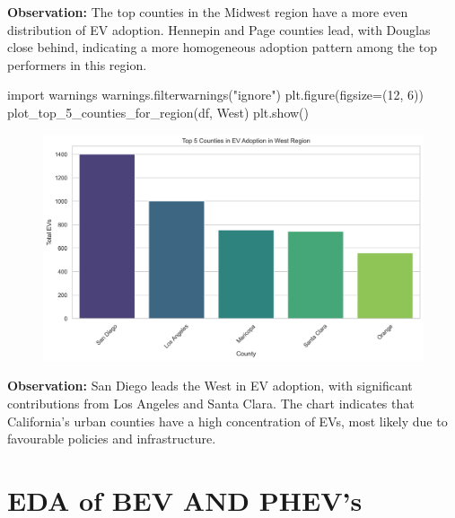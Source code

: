 \documentclass[
  letterpaper,
  DIV=11,
  numbers=noendperiod]{scrartcl}
\newenvironment{Shaded}{\begin{snugshade}}{\end{snugshade}}
\newcommand{\DecValTok}[1]{\textcolor[rgb]{0.68,0.00,0.00}{#1}}
\newcommand{\ImportTok}[1]{\textcolor[rgb]{0.00,0.46,0.62}{#1}}
\newcommand{\NormalTok}[1]{\textcolor[rgb]{0.00,0.23,0.31}{#1}}
\newcommand{\OperatorTok}[1]{\textcolor[rgb]{0.37,0.37,0.37}{#1}}
\newcommand{\StringTok}[1]{\textcolor[rgb]{0.13,0.47,0.30}{#1}}
\begin{document}
\textbf{Observation:} The top counties in the Midwest region have a more
even distribution of EV adoption. Hennepin and Page counties lead, with
Douglas close behind, indicating a more homogeneous adoption pattern
among the top performers in this region.

\begin{Shaded}
\begin{Highlighting}[]
\ImportTok{import}\NormalTok{ warnings}
\NormalTok{warnings.filterwarnings(}\StringTok{"ignore"}\NormalTok{)}
\NormalTok{plt.figure(figsize}\OperatorTok{=}\NormalTok{(}\DecValTok{12}\NormalTok{, }\DecValTok{6}\NormalTok{))}
\NormalTok{plot\_top\_5\_counties\_for\_region(df, }\StringTok{\textquotesingle{}West\textquotesingle{}}\NormalTok{)}
\NormalTok{plt.show()}
\end{Highlighting}
\end{Shaded}

\begin{figure}[H]

{\centering \includegraphics{SummaryPaper_FinalProject_T1_files/figure-pdf/cell-14-output-1.png}

}

\end{figure}

\textbf{Observation:} San Diego leads the West in EV adoption, with
significant contributions from Los Angeles and Santa Clara. The chart
indicates that California's urban counties have a high concentration of
EVs, most likely due to favourable policies and infrastructure.

\hypertarget{eda-of-bev-and-phevs}{%
\section{EDA of BEV AND PHEV's}\label{eda-of-bev-and-phevs}}
\end{document}

